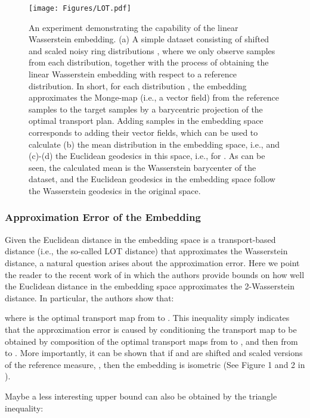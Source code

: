 \documentclass[table]{article} \usepackage{iclr2021_conference,times}
\begin{document}
\begin{figure}[t!]
    \setlength{\belowcaptionskip}{-3pt}
    \centering
    \texttt{[image: Figures/LOT.pdf]}
    \caption{An experiment demonstrating the capability of the linear Wasserstein embedding. (a) A simple dataset consisting of shifted and scaled noisy ring distributions , where we only observe samples  from each distribution, together with the process of obtaining the linear Wasserstein embedding with respect to a reference distribution. In short, for each distribution , the embedding approximates the Monge-map (i.e., a vector field) from the reference samples  to the target samples  by a barycentric projection of the optimal transport plan. Adding samples in the embedding space corresponds to adding their vector fields, which can be used to calculate (b) the mean distribution in the embedding space, i.e.,  and (c)-(d) the Euclidean geodesics in this space, i.e.,   for . As can be seen, the calculated mean is the Wasserstein barycenter of the dataset, and the Euclidean geodesics in the embedding space follow the Wasserstein geodesics in the original space. 
}
    \label{fig:lot_appendix}
\end{figure}

\subsubsection*{Approximation Error of the Embedding}

Given the Euclidean distance in the embedding space is a transport-based distance (i.e., the so-called LOT distance) that approximates the Wasserstein distance, a natural question arises about the approximation error. Here we point the reader to the recent work of \cite{moosmuller2020linear} in which the authors provide bounds on how well the Euclidean distance in the embedding space approximates the 2-Wasserstein distance. In particular, the authors show that:
        
where  is the optimal transport map from  to . This inequality simply indicates that the approximation error is caused by conditioning the transport map to be obtained by composition of the optimal transport maps from  to , and then from  to . More importantly, it can be shown that if  and  are shifted and scaled versions of the reference measure, , then the embedding is isometric (See Figure 1 and 2 in \cite{moosmuller2020linear}).

Maybe a less interesting upper bound can also be obtained by the triangle inequality:
        
\end{document}
